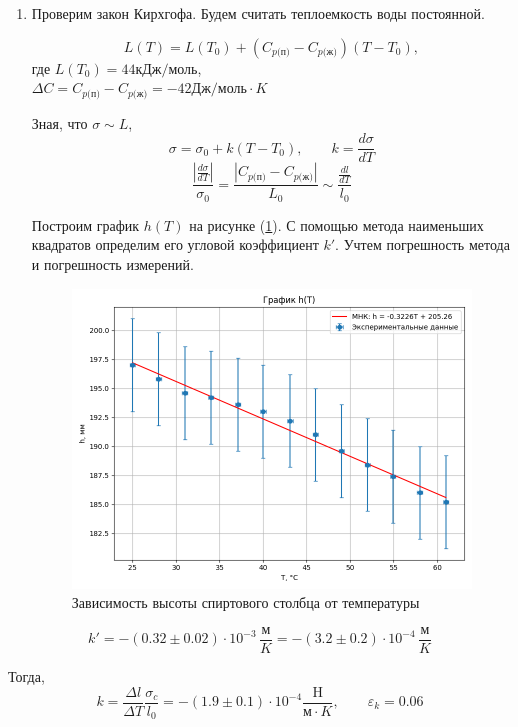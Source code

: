 \documentclass[a4paper,12pt]{article} %
\begin{document}
\begin{enumerate}
  \item Проверим закон Кирхгофа. Будем считать теплоемкость воды постоянной.
  
  \[
    L(T) = L(T_0) + (C_{p \text{(п)}} - C_{p \text{(ж)}}) (T - T_0),
  \]
  где $L(T_0) = 44 \text{кДж}/\text{моль}$, \\
  $\Delta C = C_{p \text{(п)}} - C_{p \text{(ж)}} = -42 \text{Дж}/\text{моль} \cdot K$

  Зная, что $\sigma \sim L$,
  \[
    \sigma = \sigma_0 + k (T - T_0), \qquad k = \frac{d \sigma}{dT}
  \]
  \[ 
    \frac{\left| \frac{d \sigma}{dT} \right|}{\sigma_0} = \frac{\left| C_{p \text{(п)}} - C_{p \text{(ж)}} \right|}{L_0} \sim \frac{\frac{dl}{dT}}{l_0}
  \]

  Построим график $h(T)$ на рисунке (\ref{fig:kirch}). С помощью метода наименьших квадратов определим его угловой коэффициент $k'$. Учтем погрешность метода и погрешность измерений.

  \begin{figure}[h!]
    \centering
    \includegraphics[scale = 0.75]{kirch.png}
    \caption{Зависимость высоты спиртового столбца от температуры}
    \label{fig:kirch}
  \end{figure}
  
\end{enumerate}

\[
  k' = -(0.32 \pm 0.02) \cdot 10^{-3} \, \frac{\text{м}}{K} = -(3.2 \pm 0.2) \cdot 10^{-4} \, \frac{\text{м}}{K} 
\]

Тогда,
\[
  k = \frac{\Delta l}{\Delta T} \frac{\sigma_c}{l_0} = -(1.9 \pm 0.1) \cdot 10^{-4} \frac{\text{H}}{\text{м}\cdot K}, \qquad \varepsilon_k = 0.06
\]
\end{document}
